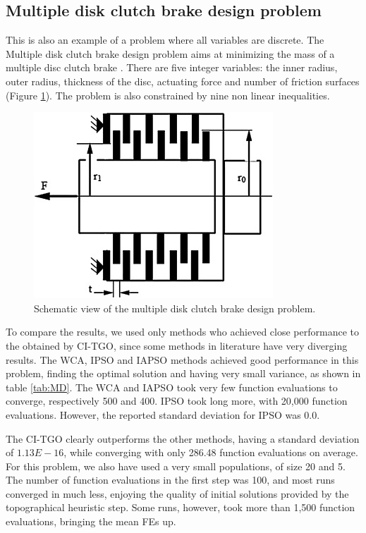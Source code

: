 \subsection{Multiple disk clutch brake design problem}

This is also an example of a problem where all variables are discrete. The Multiple disk clutch brake design problem aims at minimizing the mass of a multiple disc clutch brake \cite{MD}. There are five integer variables: the inner radius, outer radius, thickness of the disc, actuating force and number of friction surfaces (Figure \ref{fig:MD}). The problem is also constrained by nine non linear inequalities.

\begin{figure}[h]
\begin{center}
\includegraphics[scale=0.6]{Imgs/MD.jpg}
\end{center}
\captionsetup{justification=centering}
\caption{Schematic view of the multiple disk clutch brake design problem.}\label{fig:MD}
\end{figure}

To compare the results, we used only methods who achieved close performance to the obtained by CI-TGO, since some methods in literature have very diverging results. The WCA, IPSO and IAPSO methods achieved good performance in this problem, finding the optimal solution and having very small variance, as shown in table \ref{tab:MD}. The WCA and IAPSO took very few function evaluations to converge, respectively 500 and 400. IPSO took long more, with 20,000 function evaluations. However, the reported standard deviation for IPSO was 0.0.



The CI-TGO clearly outperforms the other methods, having a standard deviation of $1.13E-16$, while converging with only 286.48 function evaluations on average. For this problem, we also have used a very small populations, of size 20 and 5. The number of function evaluations in the first step was 100, and most runs converged in much less, enjoying the quality of initial solutions provided by the topographical heuristic step. Some runs, however, took more than 1,500 function evaluations, bringing the mean FEs up.

